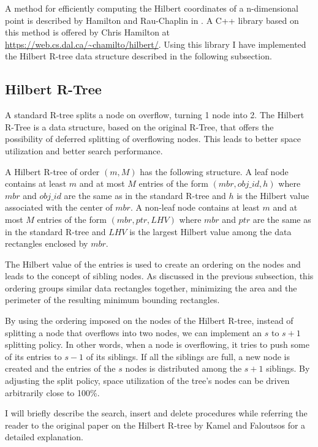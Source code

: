 \documentclass[11pt, a4paper, oneside]{article}
\begin{document}

A method for efficiently computing the Hilbert coordinates of a n-dimensional point is described by Hamilton and Rau-Chaplin in \cite{Hamilton:2008:CHI:1330769.1330914}. A C++ library based on this method is offered by Chris Hamilton at \url{https://web.cs.dal.ca/~chamilto/hilbert/}. Using this library I have implemented the Hilbert R-tree data structure described in the following subsection.

\subsection{Hilbert R-Tree}
A standard R-tree splits a node on overflow, turning 1 node into 2. The Hilbert R-Tree is a data structure, based on the original R-Tree, that offers the possibility of deferred splitting of overflowing nodes. This leads to better space utilization and better search performance.

A Hilbert R-tree of order $(m,M)$ has the following structure. A leaf node contains at least $m$ and at most $M$ entries of the form $(mbr, obj\_id, h)$ where $mbr$ and $obj\_id$ are the same as in the standard R-tree and $h$ is the Hilbert value associated with the center of $mbr$. A non-leaf node contains at least $m$ and at most $M$ entries of the form $(mbr, ptr, LHV)$ where $mbr$ and $ptr$ are the same as in the standard R-tree and $LHV$ is the largest Hilbert value among the data rectangles enclosed by $mbr$.

The Hilbert value of the entries is used to create an ordering on the nodes and leads to the concept of sibling nodes. As discussed in the previous subsection, this ordering groups similar data rectangles together, minimizing the area and the perimeter of the resulting minimum bounding rectangles.

By using the ordering imposed on the nodes of the Hilbert R-tree, instead of splitting a node that overflows into two nodes, we can implement an $s$ to $s+1$ splitting policy. In other words, when a node is overflowing, it tries to push some of its entries to $s-1$ of its siblings. If all the siblings are full, a new node is created and the entries of the $s$ nodes is distributed among the $s+1$ siblings. By adjusting the split policy, space utilization of the tree's nodes can be driven arbitrarily close to 100\%.

I will briefly describe the search, insert and delete procedures while referring the reader to the original paper on the Hilbert R-tree by Kamel and Faloutsos \cite{Kamel:1994:HRI:645920.673001} for a detailed explanation.
\end{document}
